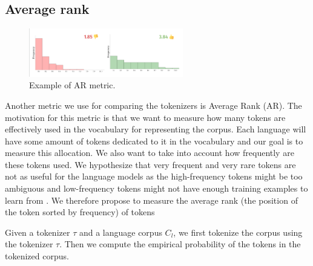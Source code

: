 \subsection{Average rank}

\begin{figure}[h]
    \centering
    \includegraphics[width=0.6\textwidth]{img/temp/ar_example.png}
    \caption{Example of AR metric.}
    \label{fig:ar_example}
\end{figure}

Another metric we use for comparing the tokenizers is Average Rank (AR). The motivation for this metric is that we want to measure how many tokens are effectively used in the vocabulary for representing the corpus. Each language will have some amount of tokens dedicated to it in the vocabulary and our goal is to measure this allocation. We also want to take into account how frequently are these tokens used. We hypothesize that very frequent and very rare tokens are not as useful for the language models as the high-frequency tokens might be too ambiguous and low-frequency tokens might not have enough training examples to learn from \cite{gowda_finding_2020}. We therefore propose to measure the average rank (the position of the token sorted by frequency) of tokens 

Given a tokenizer $\tau$ and a language corpus $C_l$, we first tokenize the corpus using the tokenizer $\tau$. Then we compute the empirical probability of the tokens in the tokenized corpus.

